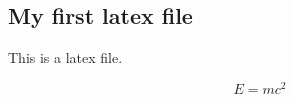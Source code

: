 \documentclass[12pt]{article}
\begin{document}
             

\begin{center}
\section*{My first latex file}  
\end{center}

This is a latex file. 

\[ E = mc^2 \]
\end{document}
